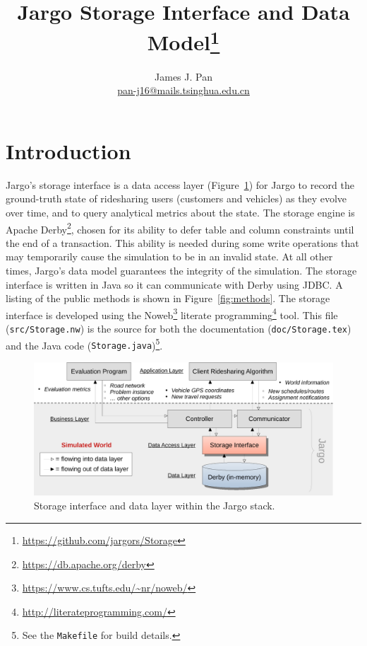 \documentclass{article}
\title{Jargo Storage Interface and Data Model\footnote{
  \url{https://github.com/jargors/Storage}}}
\author{James J. Pan\\
  \small{\href{mailto:pan-j16@mails.tsinghua.edu.cn}{pan-j16@mails.tsinghua.edu.cn}}}
\theoremstyle{definition}                   %
\begin{document}
\maketitle
\pagestyle{noweb}

\tableofcontents

\section{Introduction}
\label{sec:introduction}
Jargo's storage interface is a data access layer (Figure~\ref{fig:storage}) for
Jargo to record the ground-truth state of ridesharing users (customers and
vehicles) as they evolve over time, and to query analytical metrics about the
state.  The storage engine is Apache
Derby\footnote{\url{https://db.apache.org/derby}}, chosen for its ability to
defer table and column constraints until the end of a transaction.  This
ability is needed during some write operations that may temporarily cause the
simulation to be in an invalid state. At all other times, Jargo's data model
guarantees the integrity of the simulation. The storage interface is written in
Java so it can communicate with Derby using JDBC. A listing of the public
methods is shown in Figure~\ref{fig:methods}.  The storage interface is
developed using the Noweb\footnote{\url{https://www.cs.tufts.edu/~nr/noweb/}}
literate programming\footnote{\url{http://literateprogramming.com/}} tool.
This file ({\tt{}src/Storage.nw}) is the source for both the documentation
({\tt{}doc/Storage.tex}) and the Java code ({\tt{}Storage.java})\footnote{See the
{\tt{}Makefile} for build details.}.

\begin{figure}[h]
\centering
\includegraphics[width=150mm]{src/fig/storage-fig}
\caption{Storage interface and data layer within the Jargo stack.}
\label{fig:storage}
\end{figure}
\end{document}

